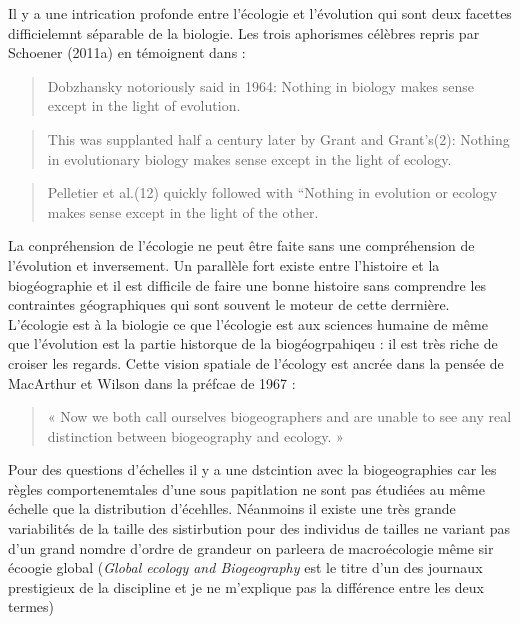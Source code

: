 Il y a une intrication profonde entre l'écologie et l'évolution qui sont
deux facettes difficielemnt séparable de la biologie. Les trois
aphorismes célèbres repris par Schoener (2011a) en témoignent dans :

\begin{quote}
\guillemotleft Dobzhansky notoriously said in 1964: Nothing in biology
makes sense except in the light of evolution. \guillemotright
\end{quote}

\begin{quote}
\guillemotleft This was supplanted half a century later by Grant and
Grant's(2): Nothing in evolutionary biology makes sense except in the
light of ecology. \guillemotright
\end{quote}

\begin{quote}
Pelletier et al.(12) quickly followed with ``Nothing in evolution or
ecology makes sense except in the light of the other. \guillemotright
\end{quote}

La conpréhension de l'écologie ne peut être faite sans une compréhension
de l'évolution et inversement. Un parallèle fort existe entre l'histoire
et la biogéographie et il est difficile de faire une bonne histoire sans
comprendre les contraintes géographiques qui sont souvent le moteur de
cette derrnière. L'écologie est à la biologie ce que l'écologie est aux
sciences humaine de même que l'évolution est la partie historque de la
biogéogrpahiqeu : il est très riche de croiser les regards. Cette vision
spatiale de l'écology est ancrée dans la pensée de MacArthur et Wilson
dans la préfcae de 1967 :

\begin{quote}
« Now we both call ourselves biogeographers and are unable to see any
real distinction between biogeography and ecology. »
\end{quote}

Pour des questions d'échelles il y a une dstcintion avec la
biogeographies car les règles comportenemtales d'une sous papitlation ne
sont pas étudiées au même échelle que la distribution d'écehlles.
Néanmoins il existe une très grande variabilités de la taille des
sistirbution pour des individus de tailles ne variant pas d'un grand
nomdre d'ordre de grandeur on parleera de macroécologie même sir écoogie
global (\emph{Global ecology and Biogeography} est le titre d'un des
journaux prestigieux de la discipline et je ne m'explique pas la
différence entre les deux termes)

